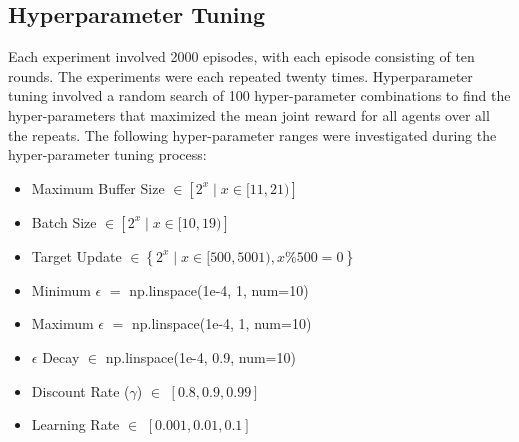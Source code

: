 \documentclass[sn-aps,numbered]{sn-jnl}%
\theoremstyle{thmstyleone}%
\theoremstyle{thmstyletwo}%
\theoremstyle{thmstylethree}%
\begin{document}
\clearpage
\begin{appendices}

\clearpage
\section{Hyperparameter Tuning}

Each experiment involved 2000 episodes, with each episode consisting of ten rounds. The experiments were each repeated twenty times. Hyperparameter tuning involved a random search of 100 hyper-parameter combinations to find the hyper-parameters that maximized the mean joint reward for all agents over all the repeats. The following hyper-parameter ranges were investigated during the hyper-parameter tuning process:

\begin{itemize}
  \item Maximum Buffer Size $\in \left[2^x \mid x \in [11,21)\right]$
  \item Batch Size $\in \left[2^x \mid x \in [10,19)\right]$
  \item Target Update $\in \left\{2^x \mid x \in [500,5001), x \% 500 = 0\right\}$
  \item Minimum $\epsilon$ $=$ np.linspace(1e-4, 1, num=10)
  \item Maximum $\epsilon$ $=$ np.linspace(1e-4, 1, num=10)
  \item $\epsilon$ Decay $\in$ np.linspace(1e-4, 0.9, num=10)
  \item Discount Rate ($\gamma$) $\in$ $[0.8, 0.9, 0.99]$
  \item Learning Rate $\in$ $[0.001, 0.01, 0.1]$
\end{itemize}

\begin{table}[h]
\caption{Hyperparameters used for all experiments, with a target update of 200, a discount rate of 0.9 and a batch size of 100. }
\end{table}


\end{appendices}
\end{document}

